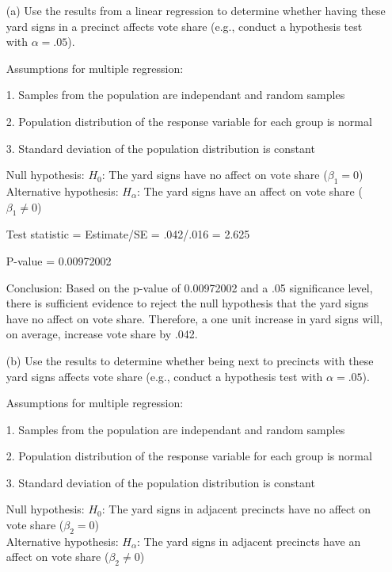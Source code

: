 \documentclass[12pt,letterpaper]{article}
\begin{document}
\vspace{.5cm}
\begin{enumerate}
	\item [(a)] Use the results from a linear regression to determine whether having these yard signs in a precinct affects vote share (e.g., conduct a hypothesis test with $\alpha = .05$).
	
	Assumptions for multiple regression:
	
	1. Samples from the population are independant and random samples
	
	2. Population distribution of the response variable for each group is normal
	
	3. Standard deviation of the population distribution is constant
	
	\newpage		
	
	Null hypothesis: $H_0$: The yard signs have no affect on vote share ($\beta_1 = 0$) \\
	Alternative hypothesis: $H_\alpha$: The yard signs have an affect on vote share ($\beta_1 \neq 0$)
	
	\vspace{.5cm}
	
	Test statistic = Estimate/SE = .042/.016 = 2.625
	
	P-value = 0.00972002
		
	
	
	
	Conclusion: Based on the p-value of 0.00972002 and a .05 significance level, there is sufficient evidence to reject the null hypothesis that the yard signs have no affect on vote share. Therefore, a one unit increase in yard signs will, on average, increase vote share by .042.
	
		\vspace{1cm}			
	\item [(b)]  Use the results to determine whether being
	next to precincts with these yard signs affects vote
	share (e.g., conduct a hypothesis test with $\alpha = .05$).
	
	Assumptions for multiple regression:
	
	1. Samples from the population are independant and random samples
	
	2. Population distribution of the response variable for each group is normal
	
	3. Standard deviation of the population distribution is constant
	
			\vspace{.25cm}			
		Null hypothesis: $H_0$: The yard signs in adjacent precincts have no affect on vote share ($\beta_2 = 0$) \\
	Alternative hypothesis: $H_\alpha$: The yard signs in adjacent precincts have an affect on vote share ($\beta_2 \neq 0$)
	

\end{enumerate}
\end{document}
